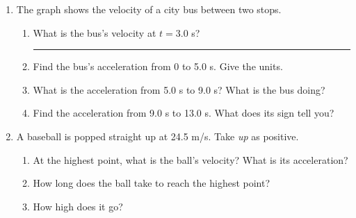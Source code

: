 \documentclass[12pt, twoside]{article}
\newcommand{\blank}[1][2.4cm]{\rule{#1}{0.4pt}}
\begin{document}
\begin{enumerate}[itemsep=0.6cm]
\newpage

\item The graph shows the velocity of a city bus between two stops.

  \begin{center}
  \end{center}

  \begin{enumerate}[itemsep=0.4cm]
    \item What is the bus's velocity at $t = 3.0$ s? \hfill \blank
      \vspace{0.6cm}
    \item Find the bus's acceleration from 0 to 5.0 s. Give the units.
      \vspace{3.0cm}
    \item What is the acceleration from 5.0 s to 9.0 s? What is the bus doing?
      \vspace{2.4cm}
    \item Find the acceleration from 9.0 s to 13.0 s. What does its sign tell you?
      \vspace{3.0cm}
  \end{enumerate}

\newpage

\item A baseball is popped straight up at 24.5 m/s. Take \emph{up} as positive.
  \begin{enumerate}[itemsep=0.4cm]
    \item At the highest point, what is the ball's velocity? What is its
      acceleration?
      \vspace{1.1cm}
    \item How long does the ball take to reach the highest point?
      \vspace{2.4cm}
    \item How high does it go?
      \vspace{2.4cm}
  \end{enumerate}


\end{enumerate}
\end{document}
